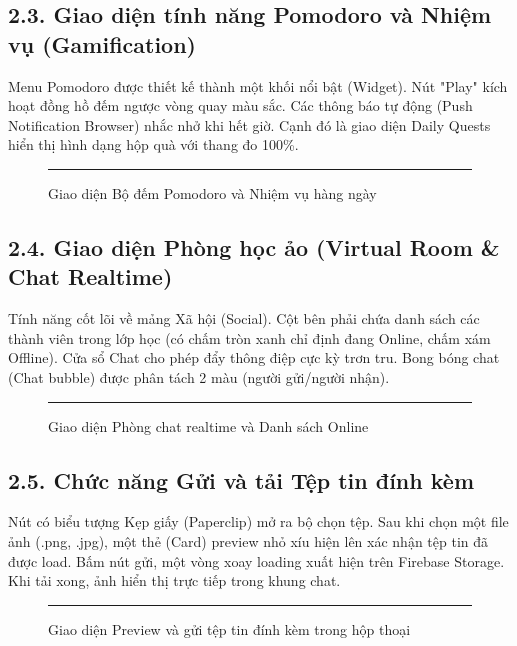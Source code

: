 \documentclass[12pt,a4paper]{report}
\begin{document}
\subsection{2.3. Giao diện tính năng Pomodoro và Nhiệm vụ (Gamification)}
Menu Pomodoro được thiết kế thành một khối nổi bật (Widget). Nút "Play" kích hoạt đồng hồ đếm ngược vòng quay màu sắc. Các thông báo tự động (Push Notification Browser) nhắc nhở khi hết giờ. Cạnh đó là giao diện Daily Quests hiển thị hình dạng hộp quà với thang đo 100\%.

\begin{figure}[H]
    \centering
    \rule{0.9\textwidth}{8cm} %
    \caption{Giao diện Bộ đếm Pomodoro và Nhiệm vụ hàng ngày}
\end{figure}

\subsection{2.4. Giao diện Phòng học ảo (Virtual Room \& Chat Realtime)}
Tính năng cốt lõi về mảng Xã hội (Social). Cột bên phải chứa danh sách các thành viên trong lớp học (có chấm tròn xanh chỉ định đang Online, chấm xám Offline). Cửa sổ Chat cho phép đẩy thông điệp cực kỳ trơn tru. Bong bóng chat (Chat bubble) được phân tách 2 màu (người gửi/người nhận).

\begin{figure}[H]
    \centering
    \rule{0.9\textwidth}{8cm} %
    \caption{Giao diện Phòng chat realtime và Danh sách Online}
\end{figure}

\subsection{2.5. Chức năng Gửi và tải Tệp tin đính kèm}
Nút có biểu tượng Kẹp giấy (Paperclip) mở ra bộ chọn tệp. Sau khi chọn một file ảnh (.png, .jpg), một thẻ (Card) preview nhỏ xíu hiện lên xác nhận tệp tin đã được load. Bấm nút gửi, một vòng xoay loading xuất hiện trên Firebase Storage. Khi tải xong, ảnh hiển thị trực tiếp trong khung chat.

\begin{figure}[H]
    \centering
    \rule{0.9\textwidth}{8cm} %
    \caption{Giao diện Preview và gửi tệp tin đính kèm trong hộp thoại}
\end{figure}
\end{document}
